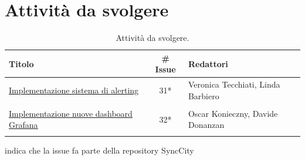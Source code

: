 \documentclass[8pt]{article}
\begin{document}
\section{Attività da svolgere}
\begin{table}[ht!]
	\centering
	\begin{tabular}{p{7cm}cp{7cm}}
		\toprule
		\textbf{Titolo} & \textbf{\# Issue} & \textbf{Redattori} \\
		\midrule
		\href{https://github.com/NaN1fy/SyncCity/issues/31}{\underline{Implementazione sistema di alerting}} & 31*\tnote{*} & Veronica Tecchiati, Linda Barbiero \\\\
		\href{https://github.com/NaN1fy/SyncCity/issues/32}{\underline{Implementazione nuove dashboard Grafana}} & 32*\tnote{*} & Oscar Konieczny, Davide Donanzan \\\\
		\bottomrule
	\end{tabular}
	\begin{tablenotes}
		\vspace{1em}
		\item * indica che la issue fa parte della repository SyncCity
	\end{tablenotes}
	\caption{Attività da svolgere.}
	\label{table:Attivita da svolgere}
\end{table}
\end{document}
